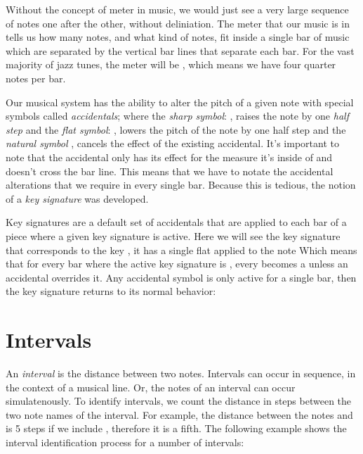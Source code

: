 Without the concept of meter in music, we would just see a very large sequence of notes one after the other, without deliniation. The meter that our music is in tells us how many notes, and what kind of notes, fit inside a single bar of music which are separated by the vertical bar lines that separate each bar. For the vast majority of jazz tunes, the meter will be , which means we have four quarter notes per bar.

Our musical system has the ability to alter the pitch of a given note with special symbols called \emph{accidentals}; where the \emph{sharp symbol}: \sharp{}, raises the note by one \emph{half step} and the \emph{flat symbol}: \flat{}, lowers the pitch of the note by one half step and the \emph{natural symbol} \natural{}, cancels the effect of the existing accidental. It's important to note that the accidental only has its effect for the measure it's inside of and doesn't cross the bar line. This means that we have to notate the accidental alterations that we require in every single bar. Because this is tedious, the notion of a \emph{key signature} was developed.

Key signatures are a default set of accidentals that are applied to each bar of a piece where a given key signature is active. Here we will see the key signature that corresponds to the key , it has a single flat applied to the note  Which means that for every bar where the active key signature is , every  becomes a  unless an accidental overrides it. Any accidental symbol is only active for a single bar, then the key signature returns to its normal behavior:


\section{Intervals}

An \emph{interval} is the distance between two notes. Intervals can occur in sequence, in the context of a musical line. Or, the notes of an interval can occur simulatenously. To identify intervals, we count the distance in steps between the two note names of the interval. For example, the distance between the notes  and  is 5 steps if we include , therefore it is a fifth. The following example shows the interval identification process for a number of intervals:

